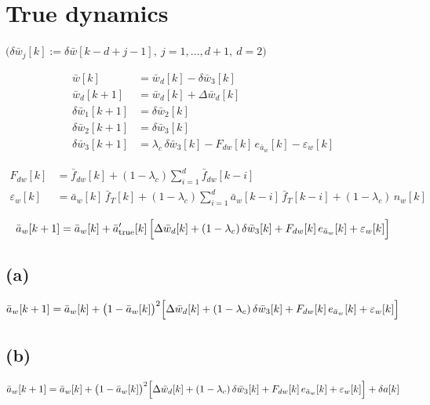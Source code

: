 \documentclass[11pt,a4paper,fontset=none]{ctexart}
\newcommand{\ba}{\bar{a}}
\newcommand{\bw}{\bar{w}}
\begin{document}
\section{True dynamics}

$\bigl(\delta\bw_j[k] := \delta\bw[k-d+j-1],\ j = 1,\dots,d+1,\ d = 2\bigr)$

\begin{align*}
\bw[k]           &= \bw_d[k] - \delta\bw_3[k] \\
\bw_d[k+1]       &= \bw_d[k] + \Delta\bw_d[k] \\
\delta\bw_1[k+1] &= \delta\bw_2[k] \\
\delta\bw_2[k+1] &= \delta\bw_3[k] \\
\delta\bw_3[k+1] &= \lambda_c\,\delta\bw_3[k] - F_{dw}[k]\,e_{\ba_w}[k]
  - \varepsilon_w[k]
\end{align*}

\begin{align*}
F_{dw}[k] &= \bar{f}_{dw}[k] + (1-\lambda_c)\sum_{i=1}^{d}\bar{f}_{dw}[k-i] \\
\varepsilon_w[k] &= \ba_w[k]\,\bar{f}_T[k]
  + (1-\lambda_c)\sum_{i=1}^{d}\ba_w[k-i]\,\bar{f}_T[k-i]
  + (1-\lambda_c)\,n_w[k]
\end{align*}

\begin{equation*}
\ba_w[k+1] = \ba_w[k] + \ba'_{\mathrm{true}}[k]\,\Bigl[
  \Delta\bw_d[k] + (1-\lambda_c)\,\delta\bw_3[k]
  + F_{dw}[k]\,e_{\ba_w}[k] + \varepsilon_w[k]\Bigr]
\end{equation*}

\subsection*{(a)}

\begin{equation*}
\ba_w[k+1] = \ba_w[k] + \bigl(1-\ba_w[k]\bigr)^{2}\Bigl[
  \Delta\bw_d[k] + (1-\lambda_c)\,\delta\bw_3[k]
  + F_{dw}[k]\,e_{\ba_w}[k] + \varepsilon_w[k]\Bigr]
\end{equation*}

\subsection*{(b)}

\begin{equation*}
\ba_w[k+1] = \ba_w[k] + \bigl(1-\ba_w[k]\bigr)^{2}\Bigl[
  \Delta\bw_d[k] + (1-\lambda_c)\,\delta\bw_3[k]
  + F_{dw}[k]\,e_{\ba_w}[k] + \varepsilon_w[k]\Bigr] + \delta a[k]
\end{equation*}
\end{document}
